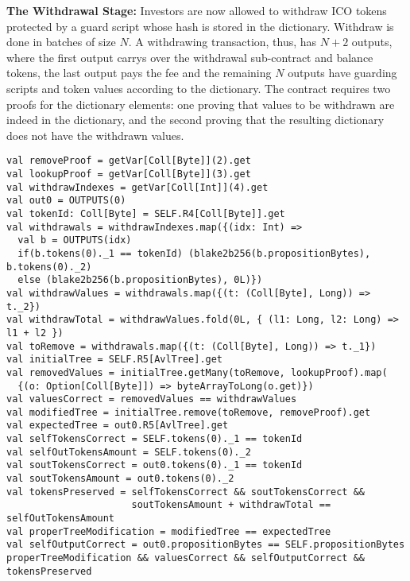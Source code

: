 \documentclass[runningheads]{llncs}
\begin{document}
\textbf{The Withdrawal Stage:}
Investors are now allowed to withdraw ICO tokens protected by a guard script whose hash is stored in the dictionary. Withdraw is done in batches of size $N$. A withdrawing transaction, thus, has $N + 2$ outputs, where the first output carrys over the withdrawal sub-contract and balance tokens, the last output pays the fee and the remaining $N$ outputs have guarding scripts and token values according to the dictionary. The contract requires two proofs for the dictionary elements: one proving that values to be withdrawn are indeed in the dictionary, and the second proving that the resulting dictionary does not have the withdrawn values. 
\small{
\begin{verbatim}
val removeProof = getVar[Coll[Byte]](2).get
val lookupProof = getVar[Coll[Byte]](3).get
val withdrawIndexes = getVar[Coll[Int]](4).get
val out0 = OUTPUTS(0)
val tokenId: Coll[Byte] = SELF.R4[Coll[Byte]].get
val withdrawals = withdrawIndexes.map({(idx: Int) =>
  val b = OUTPUTS(idx)
  if(b.tokens(0)._1 == tokenId) (blake2b256(b.propositionBytes), b.tokens(0)._2)
  else (blake2b256(b.propositionBytes), 0L)})
val withdrawValues = withdrawals.map({(t: (Coll[Byte], Long)) => t._2})
val withdrawTotal = withdrawValues.fold(0L, { (l1: Long, l2: Long) => l1 + l2 })
val toRemove = withdrawals.map({(t: (Coll[Byte], Long)) => t._1})
val initialTree = SELF.R5[AvlTree].get
val removedValues = initialTree.getMany(toRemove, lookupProof).map(
  {(o: Option[Coll[Byte]]) => byteArrayToLong(o.get)})
val valuesCorrect = removedValues == withdrawValues
val modifiedTree = initialTree.remove(toRemove, removeProof).get
val expectedTree = out0.R5[AvlTree].get
val selfTokensCorrect = SELF.tokens(0)._1 == tokenId
val selfOutTokensAmount = SELF.tokens(0)._2
val soutTokensCorrect = out0.tokens(0)._1 == tokenId
val soutTokensAmount = out0.tokens(0)._2
val tokensPreserved = selfTokensCorrect && soutTokensCorrect && 
                      soutTokensAmount + withdrawTotal == selfOutTokensAmount
val properTreeModification = modifiedTree == expectedTree
val selfOutputCorrect = out0.propositionBytes == SELF.propositionBytes
properTreeModification && valuesCorrect && selfOutputCorrect && tokensPreserved
\end{verbatim}
}

\end{document}

